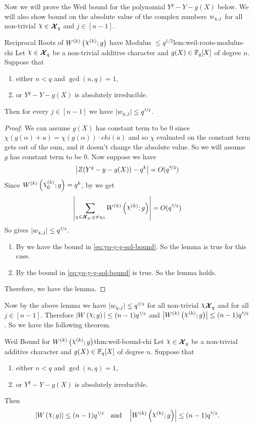 Now we will prove the Weil bound for the polynomial $Y^q-Y-g(X)$ below. We will also show bound on the absolute value of the complex numbers $w_{\oldchi,j}$ for all non-trivial $\chi\in \Xq$ and $j\in[n-1]$. 

\begin{lemma}{Reciprocal Roots of $\Wchil{k}{g}$ have Modulus $\leq q^{1/2}$}{lem:weil-roots-modulus-chi}
  Let $\chi\in\Xq$ be a non-trivial additive character and $g(X)\in\mathbb{F}_q[X]$ of degree $n$. Suppose that
  \begin{enumerate}[label=(\roman*)]
    \item either $n<q$ and $\gcd(n,q)=1$,
    \item or $Y^q-Y-g(X)$ is absolutely irreducible.
  \end{enumerate}
  Then for every $j\in[n-1]$ we have $|w_{\oldchi,j}|\leq q^{\nicefrac12}$.
\end{lemma}
\begin{proof}
  We can assume $g(X)$ has constant term to be $0$ since $\chi(g(\alpha)+a)=\chi(g(\alpha))\cdot chi(a)$ and so $\chi$ evaluated on the constant term gets out of the sum, and it doesn't change the absolute value. So we will assume $g$ has constant term to be $0$. Now suppose we have \begin{equation}\label{eq:yq-y-g-sol-bound}
    \left|Z(Y^q-y-g(X))-q^k\right|=O(q^{\nicefrac{k}2})
  \end{equation} Since $W^{(k)}\lt(\chi_0^{(k)};g\rt)=q^k$, by  we get $$\lt|\sum_{\oldchi\in\Xq,\oldchi\neq\oldchi_0}\Wchil{k}{g}\rt|=O(q^{\nicefrac{k}2})$$So \PowerSumBound gives $|w_{\oldchi,j}|\leq q^{\nicefrac12}$. 
  \begin{enumerate}[label=(\roman*)]
    \item By \Bombieri we have the bound in \eqref{eq:yq-y-g-sol-bound}. So the lemma is true for this case. 
    \item By \Weil the bound in \eqref{eq:yq-y-g-sol-bound} is true. So the lemma holds. 
  \end{enumerate}
  Therefore, we have the lemma. 
\end{proof}
Now by the above lemma we have $|w_{\oldchi,j}|\leq q^{\nicefrac12}$ for all non-trivial $\chi\Xq$ and for all $j\in[n-1]$. Therefore $|\Wchi{g}|\leq (n-1)q^{\nicefrac12}$ and $\lt|\Wchil{k}{g}\rt|\leq (n-1)q^{\nicefrac{k}2}$. So we have the following theorem.
\begin{Theorem}{Weil Bound for $\Wchil{k}{g}$}{thm:weil-bound-chi}
  Let $\chi\in\Xq$ be a non-trivial additive character and $g(X)\in\mathbb{F}_q[X]$ of degree $n$. Suppose that
  \begin{enumerate}[label=(\roman*)]
    \item either $n<q$ and $\gcd(n,q)=1$,
    \item or $Y^q-Y-g(X)$ is absolutely irreducible.
  \end{enumerate}
  Then $$\lt|\Wchi{g}\rt|\leq (n-1)q^{\nicefrac12}\quad\text{and}\quad \lt|\Wchil{k}{g}\rt|\leq (n-1)q^{\nicefrac{k}2}.$$
\end{Theorem}

